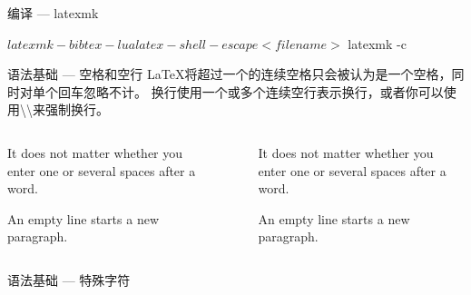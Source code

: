 \documentclass[langauge=chinese]{hustbeamer}
\begin{document}
\begin{frame}[fragile]{\secname}{编译 --- latexmk}

\begin{bashcode}
$ latexmk -bibtex -lualatex -shell-escape <file name>
$ latexmk -c
\end{bashcode}

\end{frame}

\begin{frame}[fragile]{\secname}{语法基础 --- 空格和空行}
\textrm{\LaTeX}将超过一个的连续空格只会被认为是一个空格，同时对单个回车忽略不计。
换行使用一个或多个连续空行表示换行，或者你可以使用\textbackslash{}\textbackslash{}来强制换行。

\begin{columns}
\begin{column}[b]{0.5\textwidth}
\begin{latexcode}
It does not matter whether
you enter one or several 
spaces        after a word.

An empty line starts a new
paragraph.
\end{latexcode}
\end{column}
~
\begin{column}[b]{0.5\textwidth}
\footnotesize\setlength{\parindent}{2em}
\begin{framed}
It does not matter whether
you enter one or several 
spaces        after a word.

An empty line starts a new
paragraph.
\end{framed}
\end{column}
\end{columns}
\end{frame}

\begin{frame}[fragile]{\secname}{语法基础 --- 特殊字符}
\begin{columns}
\begin{column}[b]{0.5\textwidth}
\end{column}
~
\end{columns}
\end{frame}
\end{document}
